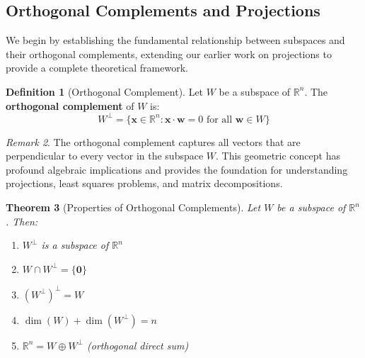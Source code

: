 \documentclass[12pt]{article}
\numberwithin{equation}{section}
\newcommand{\vect}[1]{\boldsymbol{#1}}   %
\theoremstyle{plain}
\newtheorem{theorem}{Theorem}[section]
\theoremstyle{definition}
\newtheorem{definition}[theorem]{Definition}
\theoremstyle{remark}
\newtheorem{remark}[theorem]{Remark}
\begin{document}
\subsection{Orthogonal Complements and Projections}

We begin by establishing the fundamental relationship between subspaces and their orthogonal complements, extending our earlier work on projections to provide a complete theoretical framework.

\begin{definition}[Orthogonal Complement]
Let $W$ be a subspace of $\mathbb{R}^n$. The \textbf{orthogonal complement} of $W$ is:
$$W^{\perp} = \{\vect{x} \in \mathbb{R}^n : \vect{x} \cdot \vect{w} = 0 \text{ for all } \vect{w} \in W\}$$
\end{definition}

\begin{remark}
The orthogonal complement captures all vectors that are perpendicular to every vector in the subspace $W$. This geometric concept has profound algebraic implications and provides the foundation for understanding projections, least squares problems, and matrix decompositions.
\end{remark}

\begin{theorem}[Properties of Orthogonal Complements]
Let $W$ be a subspace of $\mathbb{R}^n$. Then:
\begin{enumerate}
\item $W^{\perp}$ is a subspace of $\mathbb{R}^n$
\item $W \cap W^{\perp} = \{\vect{0}\}$
\item $(W^{\perp})^{\perp} = W$
\item $\dim(W) + \dim(W^{\perp}) = n$
\item $\mathbb{R}^n = W \oplus W^{\perp}$ (orthogonal direct sum)
\end{enumerate}
\end{theorem}
\end{document}
